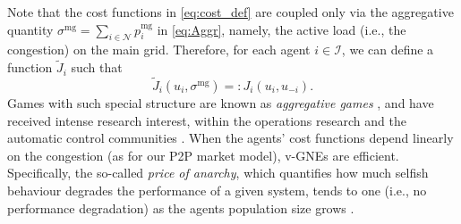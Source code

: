 \documentclass{IEEEtran}  %
\newcommand{\mc}{\mathcal}
\newcommand{\0}{\mathbf{0}}
\newcommand{\1}{\mathbf{1}}
\begin{document}
Note that the cost functions in \eqref{eq:cost_def} are coupled only via the aggregative quantity $\sigma^{\textrm{mg}} = \sum_{i\in\mathcal{N}} p_{i}^{\mathrm{mg}}$ in  \eqref{eq:Aggr}, namely, the active load (i.e., the congestion) on the main grid. Therefore, for each agent $i \in \mc I$, we can define a function $\tilde J_i$ such that
\begin{equation}
\tilde J_i(u_i, \sigma^{\textrm{mg}}) =:J_i(u_i,  u_{-i}).
\end{equation}
Games with such special structure are known as \textit{aggregative games} \cite{jensen2010aggregative}, and have received intense research interest, within the operations research and the automatic control communities \cite{paccagnan2019,belgioioso2020semi,belgioioso2020b,
gadjov2020single,bianchi2020fast}. 
{
When the agents' cost functions depend linearly on the congestion (as for our P2P market model), v-GNEs are efficient. Specifically, the so-called \textit{price of anarchy}\cite{koutsoupias1999worst}, which quantifies how much selfish behaviour degrades the performance of a given system, tends to one (i.e., no performance degradation) as the agents population size grows \cite{paccagnan2018efficiency}.}

\end{document}
